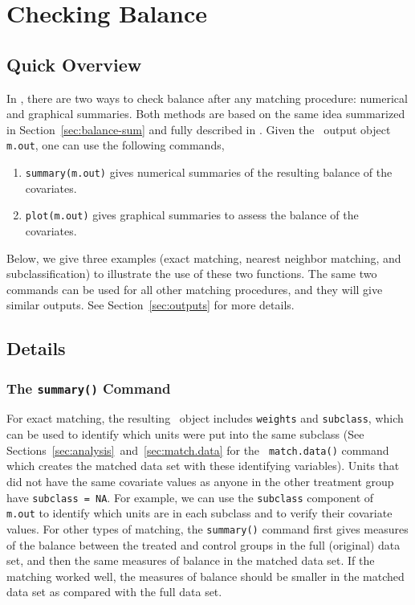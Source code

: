 \section{Checking Balance}
\label{sec:balance}

\subsection{Quick Overview}

In \MatchIt, there are two ways to check balance after any matching
procedure: numerical and graphical summaries. Both methods are based
on the same idea summarized in Section~\ref{sec:balance-sum} and fully
described in \citet*{HoImaKin05}. Given the \MatchIt\ output object
{\tt m.out}, one can use the following commands,
\begin{enumerate}
\item \texttt{summary(m.out)} gives numerical summaries of the
  resulting balance of the covariates.
  
\item \texttt{plot(m.out)} gives graphical summaries to assess the
  balance of the covariates.
\end{enumerate}
Below, we give three examples (exact matching, nearest neighbor
matching, and subclassification) to illustrate the use of these two
functions. The same two commands can be used for all other matching
procedures, and they will give similar outputs.  See
Section~\ref{sec:outputs} for more details.


\subsection{Details}


\subsubsection{The {\tt summary()} Command}

For exact matching, the resulting \MatchIt\ object includes
\texttt{weights} and \texttt{subclass}, which can be used to identify
which units were put into the same subclass (See
Sections~\ref{sec:analysis}~and~\ref{sec:match.data} for the {\tt
  match.data()} command which creates the matched data set with these
identifying variables).  Units that did not have the same covariate
values as anyone in the other treatment group have \texttt{subclass =
  NA}.  For example, we can use the {\tt subclass} component of {\tt
  m.out} to identify which units are in each subclass and to verify
their covariate values.  For other types of matching, the
\texttt{summary()} command first gives measures of the balance between
the treated and control groups in the full (original) data set, and
then the same measures of balance in the matched data set.  If the
matching worked well, the measures of balance should be smaller in the
matched data set as compared with the full data set.

